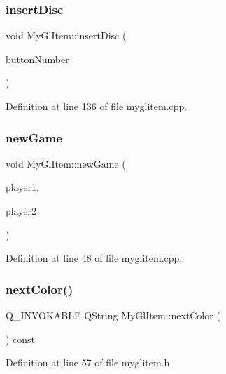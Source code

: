 \subsubsection{\texorpdfstring{insertDisc}{insertDisc}}
{\footnotesize\ttfamily void My\+Gl\+Item\+::insert\+Disc (\begin{DoxyParamCaption}\item[{int}]{button\+Number }\end{DoxyParamCaption})\hspace{0.3cm}{\ttfamily [slot]}}



Definition at line 136 of file myglitem.\+cpp.

\mbox{\label{class_my_gl_item_ad6a0178cad3d36add83687a4f95ca668}} 
\subsubsection{\texorpdfstring{newGame}{newGame}}
{\footnotesize\ttfamily void My\+Gl\+Item\+::new\+Game (\begin{DoxyParamCaption}\item[{Q\+String}]{player1,  }\item[{Q\+String}]{player2 }\end{DoxyParamCaption})\hspace{0.3cm}{\ttfamily [slot]}}



Definition at line 48 of file myglitem.\+cpp.

\mbox{\label{class_my_gl_item_a4ab53ef3f231b8d77afb50fe2dbf227f}} 
\subsubsection{\texorpdfstring{nextColor()}{nextColor()}}
{\footnotesize\ttfamily Q\+\_\+\+I\+N\+V\+O\+K\+A\+B\+LE Q\+String My\+Gl\+Item\+::next\+Color (\begin{DoxyParamCaption}{ }\end{DoxyParamCaption}) const\hspace{0.3cm}{\ttfamily [inline]}}



Definition at line 57 of file myglitem.\+h.


